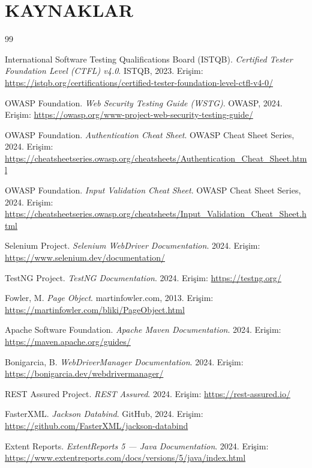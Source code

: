 \clearpage
\section*{KAYNAKLAR}

\begin{thebibliography}{99}

International Software Testing Qualifications Board (ISTQB).
\textit{Certified Tester Foundation Level (CTFL) v4.0}.
ISTQB, 2023.
Erişim: \url{https://istqb.org/certifications/certified-tester-foundation-level-ctfl-v4-0/}

OWASP Foundation.
\textit{Web Security Testing Guide (WSTG)}.
OWASP, 2024.
Erişim: \url{https://owasp.org/www-project-web-security-testing-guide/}

OWASP Foundation.
\textit{Authentication Cheat Sheet}.
OWASP Cheat Sheet Series, 2024.
Erişim: \url{https://cheatsheetseries.owasp.org/cheatsheets/Authentication_Cheat_Sheet.html}

OWASP Foundation.
\textit{Input Validation Cheat Sheet}.
OWASP Cheat Sheet Series, 2024.
Erişim: \url{https://cheatsheetseries.owasp.org/cheatsheets/Input_Validation_Cheat_Sheet.html}

Selenium Project.
\textit{Selenium WebDriver Documentation}.
2024.
Erişim: \url{https://www.selenium.dev/documentation/}

TestNG Project.
\textit{TestNG Documentation}.
2024.
Erişim: \url{https://testng.org/}

Fowler, M.
\textit{Page Object}.
martinfowler.com, 2013.
Erişim: \url{https://martinfowler.com/bliki/PageObject.html}

Apache Software Foundation.
\textit{Apache Maven Documentation}.
2024.
Erişim: \url{https://maven.apache.org/guides/}

Bonigarcia, B.
\textit{WebDriverManager Documentation}.
2024.
Erişim: \url{https://bonigarcia.dev/webdrivermanager/}

REST Assured Project.
\textit{REST Assured}.
2024.
Erişim: \url{https://rest-assured.io/}

FasterXML.
\textit{Jackson Databind}.
GitHub, 2024.
Erişim: \url{https://github.com/FasterXML/jackson-databind}

Extent Reports.
\textit{ExtentReports 5 --- Java Documentation}.
2024.
Erişim: \url{https://www.extentreports.com/docs/versions/5/java/index.html}


\end{thebibliography}
